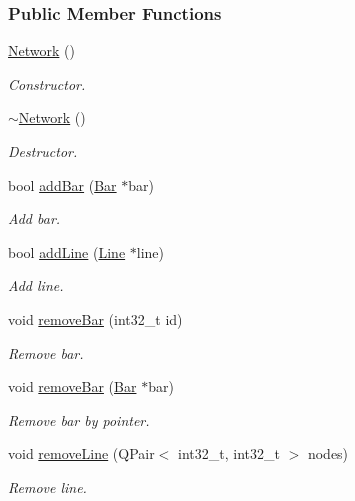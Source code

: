 \subsubsection*{Public Member Functions}
\begin{DoxyCompactItemize}
\item 
\hyperlink{group___models_ga3cc2fb4f8fa4d507077e8da85ce5a1c8}{Network} ()
\begin{DoxyCompactList}\small\item\em Constructor. \end{DoxyCompactList}\item 
\hyperlink{group___models_ga7a4e19cdb4bf0c7ecf82baa643831492}{$\sim$\+Network} ()
\begin{DoxyCompactList}\small\item\em Destructor. \end{DoxyCompactList}\item 
bool \hyperlink{group___models_ga8c5dfef0216731246f7411e1a5fbee01}{add\+Bar} (\hyperlink{class_bar}{Bar} $\ast$bar)
\begin{DoxyCompactList}\small\item\em Add bar. \end{DoxyCompactList}\item 
bool \hyperlink{group___models_gae02945131494987b3ff9b59b627719b4}{add\+Line} (\hyperlink{class_line}{Line} $\ast$line)
\begin{DoxyCompactList}\small\item\em Add line. \end{DoxyCompactList}\item 
void \hyperlink{group___models_ga997ce4f03d316b9f138f2e64e6ca400c}{remove\+Bar} (int32\+\_\+t id)
\begin{DoxyCompactList}\small\item\em Remove bar. \end{DoxyCompactList}\item 
void \hyperlink{group___models_ga7dea7690987c58fa61ffaa0326b68b68}{remove\+Bar} (\hyperlink{class_bar}{Bar} $\ast$bar)
\begin{DoxyCompactList}\small\item\em Remove bar by pointer. \end{DoxyCompactList}\item 
void \hyperlink{group___models_ga1eef3317224a7a06348fce07e581a9ad}{remove\+Line} (Q\+Pair$<$ int32\+\_\+t, int32\+\_\+t $>$ nodes)
\begin{DoxyCompactList}\small\item\em Remove line. \end{DoxyCompactList}\item 

\end{DoxyCompactItemize}
